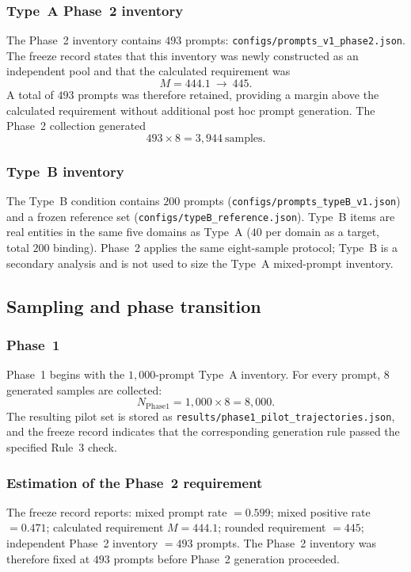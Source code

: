 \documentclass{article}
\begin{document}
\subsubsection{Type~A Phase~2 inventory}
The Phase~2 inventory contains $493$ prompts:
\texttt{configs/prompts\_v1\_phase2.json}.
The freeze record states that this inventory was newly constructed as an independent pool and that the calculated requirement was
\begin{equation}
  M=444.1\ \rightarrow\ 445.
\end{equation}
A total of $493$ prompts was therefore retained, providing a margin above the calculated requirement without additional post hoc prompt generation.
The Phase~2 collection generated
\begin{equation}
  493\times 8=3{,}944\ \text{samples}.
\end{equation}

\subsubsection{Type~B inventory}
The Type~B condition contains $200$ prompts
(\texttt{configs/prompts\_typeB\_v1.json})
and a frozen reference set
(\texttt{configs/typeB\_reference.json}).
Type~B items are real entities in the same five domains as Type~A ($40$ per domain as a target, total $200$ binding). Phase~2 applies the same eight-sample protocol; Type~B is a secondary analysis and is not used to size the Type~A mixed-prompt inventory.

\subsection{Sampling and phase transition}
\label{app:b-phase}

\subsubsection{Phase~1}
Phase~1 begins with the $1{,}000$-prompt Type~A inventory.
For every prompt, $8$ generated samples are collected:
\begin{equation}
  N_{\mathrm{Phase1}}=1{,}000\times 8=8{,}000.
\end{equation}
The resulting pilot set is stored as
\texttt{results/phase1\_pilot\_trajectories.json},
and the freeze record indicates that the corresponding generation rule passed the specified Rule~3 check.

\subsubsection{Estimation of the Phase~2 requirement}
The freeze record reports:
mixed prompt rate $=0.599$;
mixed positive rate $=0.471$;
calculated requirement $M=444.1$;
rounded requirement $=445$;
independent Phase~2 inventory $=493$ prompts.
The Phase~2 inventory was therefore fixed at $493$ prompts before Phase~2 generation proceeded.
\end{document}
